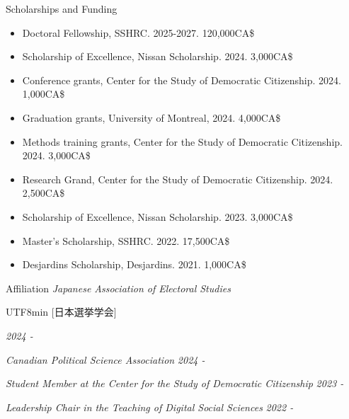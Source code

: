 \documentclass{resume} %
\begin{document}
\begin{rSection}{Scholarships and Funding}
\begin{itemize} 
  \item Doctoral Fellowship, SSHRC. 2025-2027. 120,000CA\$
  \item Scholarship of Excellence, Nissan Scholarship. 2024. 3,000CA\$
  \item Conference grants, Center for the Study of Democratic Citizenship. 2024. 1,000CA\$
  \item Graduation grants, University of Montreal, 2024. 4,000CA\$
  \item Methods training grants, Center for the Study of Democratic Citizenship. 2024. 3,000CA\$
  \item Research Grand, Center for the Study of Democratic Citizenship. 2024. 2,500CA\$
  \item Scholarship of Excellence, Nissan Scholarship. 2023. 3,000CA\$
  \item Master's Scholarship, SSHRC. 2022. 17,500CA\$
  \item Desjardins Scholarship, Desjardins. 2021. 1,000CA\$
\end{itemize}

\end{rSection}


\begin{rSection}{Affiliation} 
  {\em Japanese Association of Electoral Studies}\begin{CJK}{UTF8}{min} [日本選挙学会]\end{CJK} \hfill{\em 2024 - } \par
{\em Canadian Political Science Association} \hfill{\em 2024 - } \par
{\em Student Member at the Center for the Study of Democratic Citizenship} \hfill{\em 2023 - } \par
{\em Leadership Chair in the Teaching of Digital Social Sciences} \hfill{\em 2022 - }

\end{rSection}
\end{document}
